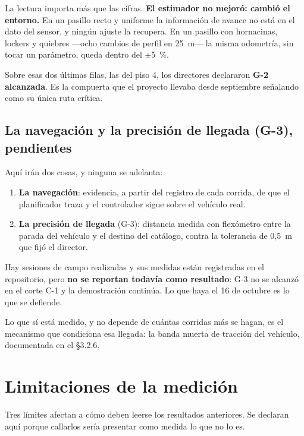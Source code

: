 La lectura importa más que las cifras. \textbf{El estimador no mejoró: cambió el
entorno.} En un pasillo recto y uniforme la información de avance no está en el
dato del sensor, y ningún ajuste la recupera. En un pasillo con hornacinas,
lockers y quiebres —ocho cambios de perfil en 25~m— la misma odometría, sin tocar
un parámetro, queda dentro del $\pm$5~\%.

Sobre esas dos últimas filas, las del piso 4, los directores declararon
\textbf{G-2 alcanzada}. Es la compuerta que el proyecto llevaba desde septiembre
señalando como su única ruta crítica.

\subsection{La navegación y la precisión de llegada (G-3), pendientes}

\begin{notaavance}
Aquí irán dos cosas, y ninguna se adelanta:

\begin{enumerate}[leftmargin=*,nosep]
  \item \textbf{La navegación}: evidencia, a partir del registro de cada
    corrida, de que el planificador traza y el controlador sigue sobre el
    vehículo real.
  \item \textbf{La precisión de llegada} (G-3): distancia medida con flexómetro
    entre la parada del vehículo y el destino del catálogo, contra la tolerancia
    de 0,5~m que fijó el director.
\end{enumerate}

Hay sesiones de campo realizadas y sus medidas están registradas en el
repositorio, pero \textbf{no se reportan todavía como resultado}: G-3 no se
alcanzó en el corte C-1 y la demostración continúa. Lo que haya el 16 de octubre
es lo que se defiende.

Lo que sí está medido, y no depende de cuántas corridas más se hagan, es el
mecanismo que condiciona esa llegada: la banda muerta de tracción del vehículo,
documentada en el §3.2.6.
\end{notaavance}

\section{Limitaciones de la medición}
\label{sec:limitaciones}

Tres límites afectan a cómo deben leerse los resultados anteriores. Se declaran
aquí porque callarlos sería presentar como medida lo que no lo es.

